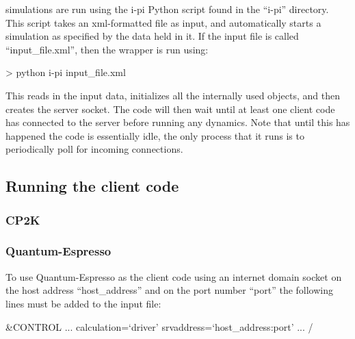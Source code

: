 \documentclass[11pt,english,fleqn]{report}
\newenvironment{code}{%
\footnotesize 
\verbatim
}{
\endverbatim
\normalsize
}
\begin{document}
\label{runningsimulations}

\ipi simulations are run using the i-pi Python script found in the
{}``i-pi'' directory. This script takes an xml-formatted file as
input, and automatically starts a simulation as specified by the data
held in it. If the input file is called {}``input\_file.xml'', then
the wrapper is run using:

\begin{code}
> python i-pi input_file.xml
\end{code}

This reads in the input data, initializes all the internally used
objects, and then creates the server socket. The code will then wait
until at least one client code has connected to the server before
running any dynamics. Note that until this has happened the code is
essentially idle, the only process that it runs is to periodically
poll for incoming connections.


\subsection{Running the client code}

\label{runningclients}


\subsubsection{CP2K}




\subsubsection{Quantum-Espresso}

To use Quantum-Espresso as the client code using an 
internet domain socket on the host
address {}``host\_address'' and on the port number {}``port''
the following lines must be added to the input file:

\begin{code}
&CONTROL
   ...
   calculation=`driver'
   srvaddress=`host_address:port'
   ...
/
\end{code}
\end{document}

